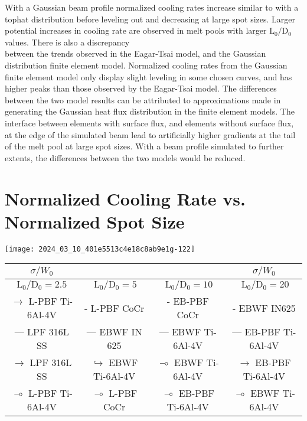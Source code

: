\documentclass[10pt]{article}
\begin{document}
With a Gaussian beam profile normalized cooling rates increase similar to with a tophat distribution before leveling out and decreasing at large spot sizes. Larger potential increases in cooling rate are observed in melt pools with larger $\mathrm{L}_{0} / \mathrm{D}_{0}$ values. There is also a discrepancy\\
between the trends observed in the Eagar-Tsai model, and the Gaussian distribution finite element model. Normalized cooling rates from the Gaussian finite element model only display slight leveling in some chosen curves, and has higher peaks than those observed by the Eagar-Tsai model. The differences between the two model results can be attributed to approximations made in generating the Gaussian heat flux distribution in the finite element models. The interface between elements with surface flux, and elements without surface flux, at the edge of the simulated beam lead to artificially higher gradients at the tail of the melt pool at large spot sizes. With a beam profile simulated to further extents, the differences between the two models would be reduced.

\section*{Normalized Cooling Rate vs. Normalized Spot Size}
\begin{center}
\texttt{[image: 2024\_03\_10\_401e5513c4e18c8ab9e1g-122]}
\end{center}

\begin{center}
\begin{tabular}{|c|c|c|c|}
\hline
$\sigma / W_{0}$ &  &  & $\sigma / W_{0}$ \\
\hline
$\mathrm{L}_{0} / \mathrm{D}_{0}=2.5$ & $\mathrm{~L}_{0} / \mathrm{D}_{0}=5$ & $\mathrm{~L}_{0} / \mathrm{D}_{0}=10$ & $\mathrm{~L}_{0} / \mathrm{D}_{0}=20$ \\
\hline
$\longrightarrow$ L-PBF Ti-6Al-4V & - L-PBF CoCr & - EB-PBF CoCr & - EBWF IN625 \\
\hline
— LPF 316L SS & — EBWF IN 625 & — EBWF Ti-6Al-4V & — EB-PBF Ti-6Al-4V \\
\hline
$\rightarrow$ LPF 316L SS & $\hookrightarrow$ EBWF Ti-6Al-4V & $\multimap$ EBWF Ti-6Al-4V & $\rightarrow$ EB-PBF Ti-6Al-4V \\
\hline
$\multimap$ L-PBF Ti-6Al-4V & $\multimap$ L-PBF CoCr & $\multimap$ EB-PBF Ti-6Al-4V & $\multimap$ EBWF Ti-6Al-4V \\
\hline
\end{tabular}
\end{center}
\end{document}
